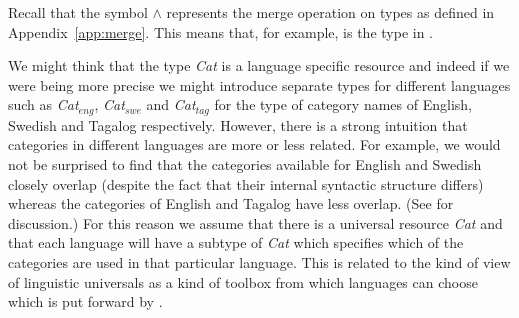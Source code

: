 Recall that the symbol \d{$\wedge$} represents the merge operation on
types as defined in Appendix~\ref{app:merge}.  This means that, for
example,  is the type in \nexteg{}.
\begin{ex} 
\end{ex} 
  

We might think that the type \textit{Cat} is a language specific
resource and indeed if we were being more precise we might introduce
separate types for different languages such as
\textit{Cat}$_{\mathit{eng}}$, \textit{Cat}$_{\mathit{swe}}$ and
\textit{Cat}$_{\mathit{tag}}$ for
the type of category names of English, Swedish and Tagalog respectively.
However, there is a strong intuition that categories in different
languages are more or less related.  For example, we would not be
surprised to find that the categories available for English and
Swedish closely overlap (despite the fact that their internal
syntactic structure differs) whereas the categories of English and Tagalog
have less overlap.  (See \citealp{Gil2000} for discussion.)  For this
reason we assume that there is a universal resource \textit{Cat} and
that each language will have a subtype of \textit{Cat} which specifies
which of the categories are used in that particular language.  This is
related to the kind of view of linguistic universals as a kind of
toolbox from which languages can choose which is put forward by
\cite{Jackendoff2002}.

